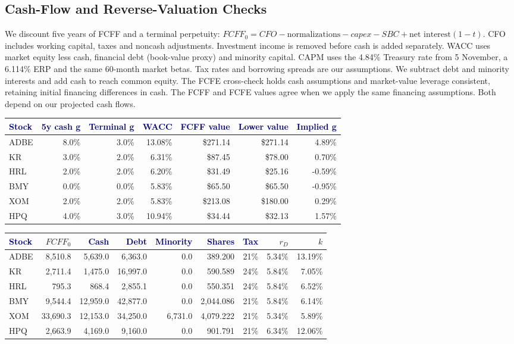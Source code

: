 \documentclass[10pt,a4paper]{article}
\newcommand{\hd}[1]{\textcolor{navy}{\textbf{#1}}}
\begin{document}
\subsection{Cash-Flow and Reverse-Valuation Checks}
We discount five years of FCFF and a terminal perpetuity: $FCFF_0=CFO-\text{normalizations}-capex-SBC+\text{net interest}(1-t)$. CFO includes working capital, taxes and noncash adjustments. Investment income is removed before cash is added separately. WACC uses market equity less cash, financial debt (book-value proxy) and minority capital. CAPM uses the 4.84\% Treasury rate from 5 November, a 6.114\% ERP and the same 60-month market betas. Tax rates and borrowing spreads are our assumptions. We subtract debt and minority interests and add cash to reach common equity. The FCFE cross-check holds cash assumptions and market-value leverage consistent, retaining initial financing differences in cash. The FCFF and FCFE values agree when we apply the same financing assumptions. Both depend on our projected cash flows.
\begin{center}\small
\begin{tabular}{lrrrrrr}\toprule
\hd{Stock}&\hd{5y cash g}&\hd{Terminal g}&\hd{WACC}&\hd{FCFF value}&\hd{Lower value}&\hd{Implied g}\\\midrule
ADBE & 8.0\% & 3.0\% & 13.08\% & \$271.14 & \$271.14 & 4.89\% \\
KR & 3.0\% & 2.0\% & 6.31\% & \$87.45 & \$78.00 & 0.70\% \\
HRL & 2.0\% & 2.0\% & 6.20\% & \$31.49 & \$25.16 & -0.59\% \\
BMY & 0.0\% & 0.0\% & 5.83\% & \$65.50 & \$65.50 & -0.95\% \\
XOM & 2.0\% & 2.0\% & 5.83\% & \$213.08 & \$180.00 & 0.29\% \\
HPQ & 4.0\% & 3.0\% & 10.94\% & \$34.44 & \$32.13 & 1.57\% \\
\bottomrule\end{tabular}\end{center}
\begin{center}\footnotesize\setlength{\tabcolsep}{4pt}
\begin{tabular}{lrrrrrrrr}\toprule
\hd{Stock}&$FCFF_0$&\hd{Cash}&\hd{Debt}&\hd{Minority}&\hd{Shares}&\hd{Tax}&$r_D$&$k$\\\midrule
ADBE & 8,510.8 & 5,639.0 & 6,363.0 & 0.0 & 389.200 & 21\% & 5.34\% & 13.19\% \\
KR & 2,711.4 & 1,475.0 & 16,997.0 & 0.0 & 590.589 & 24\% & 5.84\% & 7.05\% \\
HRL & 795.3 & 868.4 & 2,855.1 & 0.0 & 550.351 & 24\% & 5.84\% & 6.52\% \\
BMY & 9,544.4 & 12,959.0 & 42,877.0 & 0.0 & 2,044.086 & 21\% & 5.84\% & 6.14\% \\
XOM & 33,690.3 & 12,153.0 & 34,250.0 & 6,731.0 & 4,079.222 & 21\% & 5.34\% & 5.89\% \\
HPQ & 2,663.9 & 4,169.0 & 9,160.0 & 0.0 & 901.791 & 21\% & 6.34\% & 12.06\% \\
\bottomrule\end{tabular}\end{center}
\end{document}
